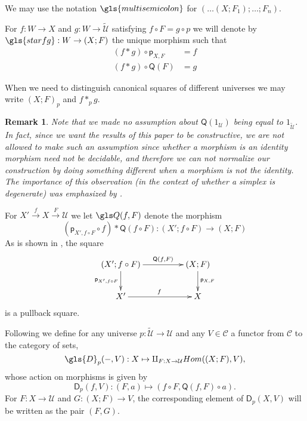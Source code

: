 \documentclass[12pt]{article}
\numberwithin{equation}{section}
\newenvironment{eq}{\begin{equation}}{\end{equation}}
\newtheorem{remark}[proposition]{Remark}
\newcommand{\llabel}[1]{\label{#1}}
\newcommand{\sr}{\rightarrow}
\newcommand{\wt}{\widetilde}
\newcommand{\id}{1}            %
\newcommand{\p}{\mathsf{p}}
\newcommand{\U}{\mathcal{U}}
\newcommand{\D}{\mathsf{D}}
\newcommand{\Q}{\mathsf{Q}}
\begin{document}
We may use the notation $\gls{multisemicolon}$ for $(\dots(X;F_1);\dots;F_n)$.

For $f:W\sr X$ and $g:W\sr \wt{\U}$ satisfying $f\circ F = g \circ p$ we will denote by $\gls{starfg} : W \sr (X;F)$ the unique morphism
such that
%
\begin{align}
  (f*g)\circ \p_{X,F} & =f \label{star-eq1} \\
  (f*g)\circ \Q(F) & =g \label{star-eq2}
\end{align}

%
When we need to distinguish canonical squares of different universes we may
write $(X;F)_{p}$ and $f*_p g$.
%
\begin{remark}\rm
\llabel{2015.03.29.rm1} Note that we made no assumption about $\Q(\id_\U)$ being
equal to $\id_{\wt{\U}}$. In fact, since we want the results of this paper to be
constructive, we are not allowed to make such an assumption since 
whether a morphism is an identity morphism need not be
decidable, and therefore we can not normalize our construction by doing
something different when a morphism is not the identity.  The importance
of this observation (in the context of whether a simplex is degenerate)
was emphasized by \cite{BCH}.
\end{remark}
%
For $X'\stackrel{f}{\sr}X\stackrel{F}{\sr}\U$ we let $\gls Q(f,F)$ denote the
morphism
%
$$(\p_{X',f\circ F}\circ f)*\Q(f\circ F):(X';f\circ F)\sr (X;F)$$
%
As is shown in \cite{fromunivwithPi}, the square
%
\begin{eq}
\llabel{2015.04.06.l0.sq}
\begin{xy}
          \xymatrix@C=4pc{ (X';f\circ F) \ar[r]^-{\Q(f,F)} \ar[d]_{\p_{X',f\circ
                F}} & (X;F) \ar[d]^{\p_{X,F}}\\ X' \ar[r]^{f} & X }
       \end{xy}
\end{eq}%
%
is a pullback square.

Following \cite{fromunivwithPi} we define for any universe $p:\wt{\U}\sr \U$ and
any $V\in {\mathcal C}$ a functor from $\mathcal C$ to the category of sets,
%
$$\gls{D}_p(-,V):X\mapsto \amalg_{F:X\sr \U}Hom((X;F), V),$$
%
whose action on morphisms is given by
%
$$\D_p(f,V):(F,a)\mapsto (f\circ F, \Q(f,F)\circ a).$$
For $F:X\sr \U$ and $G : (X;F) \sr V$, the corresponding element of
$\D_p(X,V)$ will be written as the pair $(F,G)$.
\end{document}
